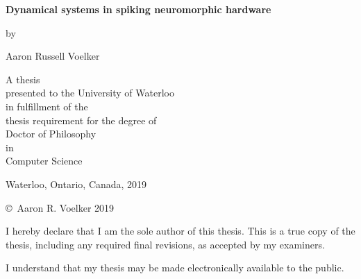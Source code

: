 \pagestyle{empty}

\begin{titlepage}
  \begin{center}
    \vspace*{1.0cm}

    \Huge
    {\bf Dynamical systems in spiking neuromorphic hardware}

    \vspace*{1.0cm}

    \normalsize
    by \\

    \vspace*{1.0cm}

    \Large
    Aaron Russell Voelker \\

    \vspace*{3.0cm}

    \normalsize
    A thesis \\
    presented to the University of Waterloo \\
    in fulfillment of the \\
    thesis requirement for the degree of \\
    Doctor of Philosophy \\
    in \\
    Computer Science \\

    \vspace*{2.0cm}

    Waterloo, Ontario, Canada, 2019 \\

    \vspace*{1.0cm}

    \copyright\ Aaron R. Voelker 2019 \\
  \end{center}
\end{titlepage}

\pagestyle{plain}
\setcounter{page}{2}

\cleardoublepage
{}
{}

\noindent
I hereby declare that I am the sole author of this thesis. This is a
true copy of the thesis, including any required final revisions, as
accepted by my examiners.

\bigskip

\noindent
I understand that my thesis may be made electronically available to
the public.

\cleardoublepage
